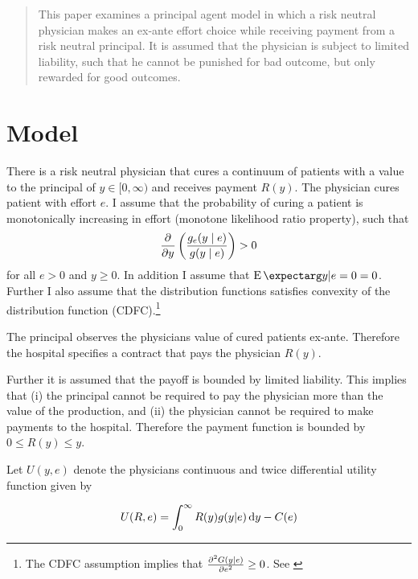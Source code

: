 


\maketitle
\begin{abstract}
This paper examines a principal agent model in which a risk neutral physician makes an ex-ante effort choice while receiving payment from a risk neutral
principal. It is assumed that the physician is subject to limited liability, such
that he cannot be punished for bad outcome, but only rewarded for good outcomes.
\end{abstract}

\section{Model} %
\label{sec:model}
There is a risk neutral physician that cures a continuum of patients with a value to the principal of $y\in[0,\infty)$ and receives payment $R(y)$. The physician cures patient with effort $e$. I assume that the probability of curing a patient is monotonically increasing in effort (monotone likelihood ratio property), such that 
\begin{align}
    \pder{y}\left(\frac{g_e(y\mid e)}{g(y\mid e)}\right)>0 \label{eq:mlrp}
\end{align}
for all $e>0$ and $y\ge 0$. In addition I assume that $\cEX{y|e=0}=0$. Further I also assume that the distribution functions satisfies convexity of the distribution function (CDFC).\footnote{The CDFC assumption implies that $\pder[G(y|e)][2]{e}\geq0$. See \textcite[][p. 1362]{Rogerson1985FirstOrder}}

The principal observes the physicians value of cured patients ex-ante. Therefore the hospital specifies a contract that pays the physician $R(y)$.

Further it is assumed that the payoff is bounded by limited liability. This implies that (i) the principal cannot be required to pay the physician more than the value of the production, and (ii) the physician cannot be required to make payments to the hospital.  Therefore the payment function is bounded by $0\leq R(y)\leq y$.

Let $U(y,e)$ denote the physicians continuous and twice differential utility function given by 

\begin{align}
    U(R,e)=\int_0^\infty R(y)g(y|e)\dif y-C(e) \label{eq:utility}
\end{align}

